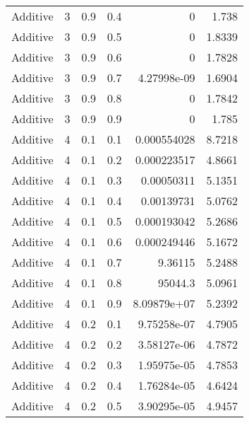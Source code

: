 \documentclass{article}
\begin{document}
\begin{longtable}[H]{lrrrrr}
 Additive       &       3 &   0.9 &            0.4 &      0           &          1.738  \\
 Additive       &       3 &   0.9 &            0.5 &      0           &          1.8339 \\
 Additive       &       3 &   0.9 &            0.6 &      0           &          1.7828 \\
 Additive       &       3 &   0.9 &            0.7 &      4.27998e-09 &          1.6904 \\
 Additive       &       3 &   0.9 &            0.8 &      0           &          1.7842 \\
 Additive       &       3 &   0.9 &            0.9 &      0           &          1.785  \\
 Additive       &       4 &   0.1 &            0.1 &      0.000554028 &          8.7218 \\
 Additive       &       4 &   0.1 &            0.2 &      0.000223517 &          4.8661 \\
 Additive       &       4 &   0.1 &            0.3 &      0.00050311  &          5.1351 \\
 Additive       &       4 &   0.1 &            0.4 &      0.00139731  &          5.0762 \\
 Additive       &       4 &   0.1 &            0.5 &      0.000193042 &          5.2686 \\
 Additive       &       4 &   0.1 &            0.6 &      0.000249446 &          5.1672 \\
 Additive       &       4 &   0.1 &            0.7 &      9.36115     &          5.2488 \\
 Additive       &       4 &   0.1 &            0.8 &  95044.3         &          5.0961 \\
 Additive       &       4 &   0.1 &            0.9 &      8.09879e+07 &          5.2392 \\
 Additive       &       4 &   0.2 &            0.1 &      9.75258e-07 &          4.7905 \\
 Additive       &       4 &   0.2 &            0.2 &      3.58127e-06 &          4.7872 \\
 Additive       &       4 &   0.2 &            0.3 &      1.95975e-05 &          4.7853 \\
 Additive       &       4 &   0.2 &            0.4 &      1.76284e-05 &          4.6424 \\
 Additive       &       4 &   0.2 &            0.5 &      3.90295e-05 &          4.9457 \\

\end{longtable}
\end{document}
